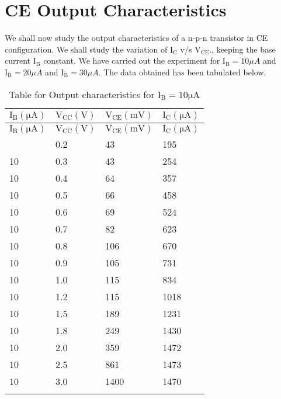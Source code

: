 \documentclass[12pt]{article}
\begin{document}
\section{CE Output Characteristics}
We shall now study the output characteristics of a n-p-n transistor in CE configuration. We shall study the variation of $\mathrm{I_C}$ v/s $\mathrm{V_{CE}}$., keeping the base current $\mathrm{I_B}$ constant. We have carried out the experiment for $\mathrm{I_B}=10 \mu A$ and $\mathrm{I_B}=20 \mu A$ and $\mathrm{I_B}= 30 \mu A$. The data obtained has been tabulated below.
\begin{longtable}{|l|l|l|l|}
	\hline
    $\mathrm{I_{B}(\mu A)}$ & $\mathrm{V_{CC}(V)}$& $\mathrm{V_{CE}(mV)}$&  $\mathrm{I_{C}(\mu A)}$ \\ \hline
	\endfirsthead
	\hline
    $\mathrm{I_{B}(\mu A)}$ & $\mathrm{V_{CC}(V)}$ & $\mathrm{V_{CE}(mV)}$&  $\mathrm{I_{C}(\mu A)}$ \\ \hline
	\endhead
	\hline
	\endfoot
	\endlastfoot
    10  & 0.2  & 43   & 195  \\ \hline
    10  & 0.3  & 43   & 254  \\ \hline
    10  & 0.4  & 64   & 357  \\ \hline
    10  & 0.5  & 66   & 458  \\ \hline
    10  & 0.6  & 69   & 524  \\ \hline
    10  & 0.7  & 82   & 623  \\ \hline
    10  & 0.8  & 106  & 670  \\ \hline
    10  & 0.9  & 105  & 731  \\ \hline
    10  & 1.0  & 115  & 834  \\ \hline
    10  & 1.2  & 115  & 1018 \\ \hline
    10  & 1.5  & 189  & 1231 \\ \hline
    10  & 1.8  & 249  & 1430 \\ \hline
    10  & 2.0  & 359  & 1472 \\ \hline
    10  & 2.5  & 861  & 1473 \\ \hline
    10  & 3.0  & 1400 & 1470 \\ \hline
\caption{Table for Output characteristics for $\mathrm{I_B=10 \mu A}$}
\label{tab:part02_01}
\end{longtable}
\end{document}
